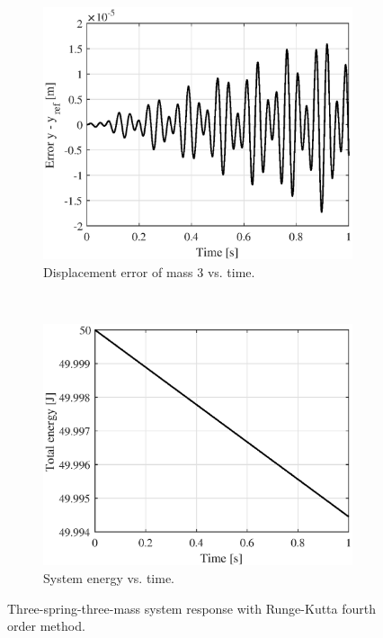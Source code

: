 \documentclass{article}
\begin{document}
\begin{figure}[h!]
		\begin{subfigure}[t]{0.45\textwidth}
			\includegraphics[width=\textwidth]{assignment_rk4_error.eps}
			\caption{Displacement error of mass 3 vs. time.}
		\end{subfigure}~
		\begin{subfigure}[t]{0.45\textwidth}
			\includegraphics[width=\textwidth]{assignment_rk4_energy.eps}
			\caption{System energy vs. time.}
		\end{subfigure}
		\caption{Three-spring-three-mass system response with Runge-Kutta fourth order method.\label{fig:assignment_rungekutta}}
	\end{figure}
\end{document}
